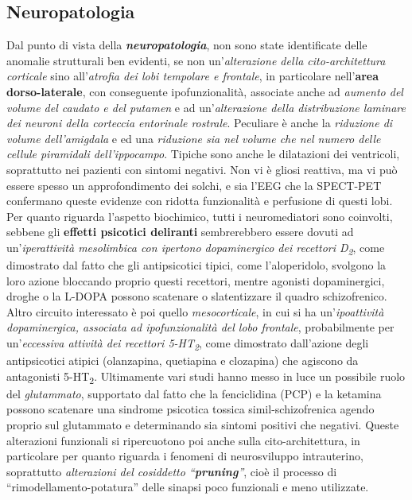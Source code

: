 \subsection{Neuropatologia}
Dal punto di vista della \textbf{\emph{neuropatologia}}, non sono state
identificate delle anomalie strutturali ben evidenti, se non
un'\emph{alterazione della cito-architettura corticale} sino
all'\emph{atrofia dei lobi tempolare e frontale}, in particolare
nell'\textbf{area dorso-laterale}, con conseguente ipofunzionalità,
associate anche ad \emph{aumento del volume del caudato e del putamen} e
ad un'\emph{alterazione della distribuzione laminare dei neuroni della
corteccia entorinale rostrale}. Peculiare è anche la \emph{riduzione di
volume dell'amigdala} e ed una \emph{riduzione sia nel volume che nel
numero delle cellule piramidali dell'ippocampo}. Tipiche sono anche le
dilatazioni dei ventricoli, soprattutto nei pazienti con sintomi
negativi. Non vi è gliosi reattiva, ma vi può essere spesso un
approfondimento dei solchi, e sia l'EEG che la SPECT-PET confermano
queste evidenze con ridotta funzionalità e perfusione di questi lobi.
Per quanto riguarda l'aspetto biochimico, tutti i neuromediatori sono
coinvolti, sebbene gli \textbf{effetti psicotici deliranti}
sembrerebbero essere dovuti ad un'\emph{iperattività mesolimbica con
ipertono dopaminergico dei recettori D\textsubscript{2}}, come
dimostrato dal fatto che gli antipsicotici tipici, come l'aloperidolo,
svolgono la loro azione bloccando proprio questi recettori, mentre
agonisti dopaminergici, droghe o la L-DOPA possono scatenare o
slatentizzare il quadro schizofrenico. Altro circuito interessato è poi
quello \emph{mesocorticale}, in cui si ha un'\emph{ipoattività
dopaminergica, associata ad ipofunzionalità del lobo frontale},
probabilmente per un'\emph{eccessiva attività dei recettori
5-HT\textsubscript{2}}, come dimostrato dall'azione degli antipsicotici
atipici (olanzapina, quetiapina e clozapina) che agiscono da antagonisti
5-HT\textsubscript{2}. Ultimamente vari studi hanno messo in luce un
possibile ruolo del \emph{glutammato}, supportato dal fatto che la
fenciclidina (PCP) e la ketamina possono scatenare una sindrome
psicotica tossica simil-schizofrenica agendo proprio sul glutammato e
determinando sia sintomi positivi che negativi. Queste alterazioni
funzionali si ripercuotono poi anche sulla cito-architettura, in
particolare per quanto riguarda i fenomeni di neurosviluppo
intrauterino, soprattutto \emph{alterazioni del cosiddetto
``\textbf{pruning}''}, cioè il processo di ``rimodellamento-potatura''
delle sinapsi poco funzionali e meno utilizzate.

